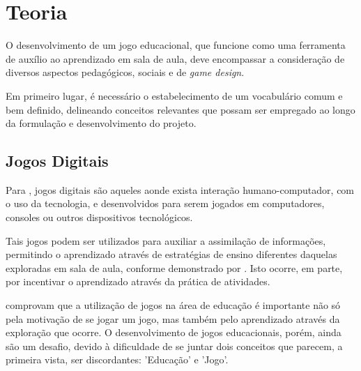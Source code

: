 
\chapter{Teoria}\label{cap-teoria}

O desenvolvimento de um jogo educacional, que funcione como uma ferramenta de auxílio ao
aprendizado em sala de aula, deve encompassar a consideração de diversos aspectos
pedagógicos, sociais e de \textit{game design}.

Em primeiro lugar, é necessário o estabelecimento de um vocabulário comum e bem
definido, delineando conceitos relevantes que possam ser empregado ao longo da 
formulação e desenvolvimento do projeto.

\section{Jogos Digitais}\label{sec-jogosdigitais}

Para \cite{correia:2009:digital_games_spore}, jogos digitais são aqueles aonde exista
interação humano-computador, com o uso da tecnologia, e desenvolvidos para serem 
jogados em computadores, consoles ou outros dispositivos tecnológicos.

Tais jogos podem ser utilizados para auxiliar a assimilação de informações, permitindo
o aprendizado através de estratégias de ensino diferentes daquelas exploradas em sala
de aula, conforme demonstrado por \cite{fernandes:2012:digital_education}. Isto 
ocorre, em parte, por incentivar o aprendizado através da prática de atividades.

\cite{correia:2009:digital_games_spore} comprovam que a utilização de jogos 
na área de educação é importante não só pela motivação de se jogar um jogo, 
mas também pelo aprendizado através da exploração que ocorre. O 
desenvolvimento de jogos educacionais, porém, ainda são um desafio, devido 
à dificuldade de se juntar dois conceitos que parecem, a primeira vista,
ser discordantes: 'Educação' e 'Jogo'.



